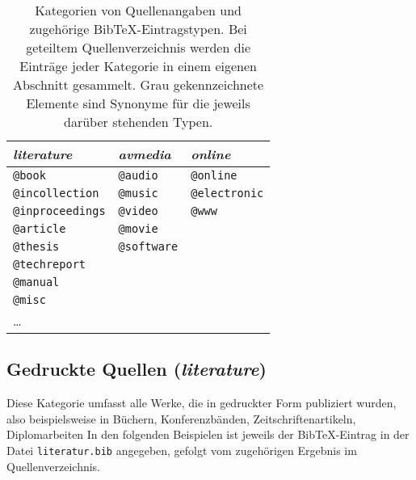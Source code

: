 \begin{table}
\caption{Kategorien von Quellenangaben und zugehörige BibTeX-Eintragstypen.
Bei geteiltem Quellenverzeichnis werden die Einträge jeder Kategorie in einem
eigenen Abschnitt gesammelt.
Grau gekennzeichnete Elemente sind Synonyme für die jeweils darüber stehenden Typen.}
\label{tab:BibKategorien}
\centering
{}
\setlength{\tabcolsep}{6mm}
\begin{tabular}{lll}
	\emph{literature} & \emph{avmedia} & \emph{online} \\
	\hline
	\texttt{@book}          & \texttt{@audio}                & \texttt{@online} \\
	\texttt{@incollection}  & \texttt{\color{midgray}@music} & \texttt{\color{midgray}@electronic} \\
	\texttt{@inproceedings} & \texttt{@video}                & \texttt{\color{midgray}@www} \\
	\texttt{@article}       & \texttt{@movie}                &  \\
	\texttt{@thesis}        & \texttt{@software}             &  \\
	\texttt{@techreport}    &  &  \\
	\texttt{@manual}        &  &  \\
	\texttt{@misc}          &  &  \\
	\ldots                  &  &  \\
	\hline
\end{tabular}
\end{table}


\subsection{Gedruckte Quellen (\emph{literature})}
\label{sec:KategorieLiterature}

Diese Kategorie umfasst alle Werke, die in gedruckter Form publiziert wurden,
also beispielsweise in Büchern, Konferenzbänden, Zeitschriftenartikeln, Diplomarbeiten \usw
In den folgenden Beispielen ist jeweils der BibTeX-Eintrag in der Datei \nolinkurl{literatur.bib}
angegeben, gefolgt vom zugehörigen Ergebnis im Quellenverzeichnis.


